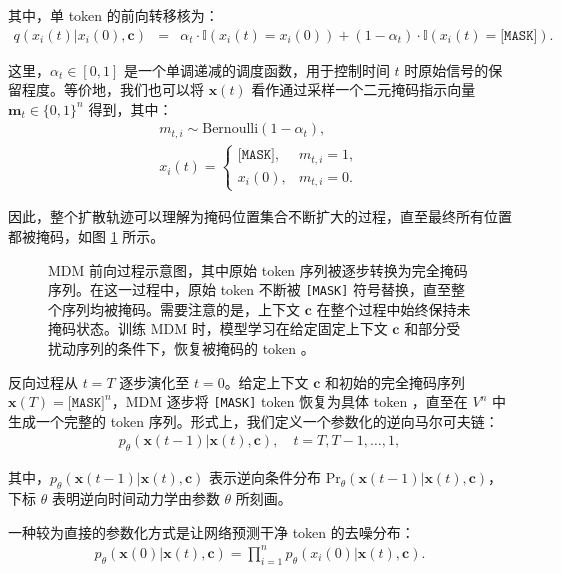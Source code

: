 \documentclass[UTF8,a4paper,zihao=-4,oneside,openany]{ctexbook}
\makeatletter
\newcommand{\AMLFigure}[2][0.96\linewidth]{%
  \begingroup
  \let\AtBeginDocument\@gobble
  \endgroup
}
\makeatother
\begin{document}
\noindent 其中，单 token 的前向转移核为：
\begin{eqnarray}
q(x_i(t) | x_i(0), \mathbf{c}) & = &\alpha_t \cdot \mathbb{I}(x_i(t)=x_i(0)) + (1-\alpha_t)\cdot \mathbb{I}(x_i(t)=\texttt{[MASK]}). \label{eq:mdm-forward-absorbing}
\end{eqnarray}

\noindent 这里，$\alpha_t \in [0,1]$ 是一个单调递减的调度函数，用于控制时间 $t$ 时原始信号的保留程度。等价地，我们也可以将 $\mathbf{x}(t)$ 看作通过采样一个二元掩码指示向量 $\mathbf{m}_t\in\{0,1\}^n$ 得到，其中：
\begin{eqnarray}
m_{t,i} \sim \mathrm{Bernoulli}(1-\alpha_t), \\
x_i(t) = \begin{cases}
\texttt{[MASK]}, & m_{t,i}=1, \\
x_i(0), & m_{t,i}=0.
\end{cases}
\label{eq:mdm-forward-maskvar}
\end{eqnarray}

\noindent 因此，整个扩散轨迹可以理解为掩码位置集合不断扩大的过程，直至最终所有位置都被掩码，如图 \ref{fig:mdm-diffusion-process} 所示。

\begin{figure}[!t]
\centering
\AMLFigure{figure-mdm-diffusion-process}
\caption{MDM 前向过程示意图，其中原始 token 序列被逐步转换为完全掩码序列。在这一过程中，原始 token 不断被 \texttt{[MASK]} 符号替换，直至整个序列均被掩码。需要注意的是，上下文 $\mathbf{c}$ 在整个过程中始终保持未掩码状态。训练 MDM 时，模型学习在给定固定上下文 $\mathbf{c}$ 和部分受扰动序列的条件下，恢复被掩码的 token 。}
\label{fig:mdm-diffusion-process}
\end{figure}

反向过程从 $t=T$ 逐步演化至 $t=0$。给定上下文 $\mathbf{c}$ 和初始的完全掩码序列 $\mathbf{x}(T)=\texttt{[MASK]}^n$，MDM 逐步将 \texttt{[MASK]}  token 恢复为具体 token ，直至在 $V^n$ 中生成一个完整的 token 序列。形式上，我们定义一个参数化的逆向马尔可夫链：
\begin{eqnarray}
p_\theta(\mathbf{x}(t-1)| \mathbf{x}(t), \mathbf{c}), \quad t=T,T-1,\dots,1,
\label{eq:mdm-reverse-kernel}
\end{eqnarray}

\noindent 其中，$p_\theta(\mathbf{x}(t-1)| \mathbf{x}(t),\mathbf{c})$ 表示逆向条件分布 $\mathrm{Pr}_\theta(\mathbf{x}(t-1)| \mathbf{x}(t),\mathbf{c})$，下标 $\theta$ 表明逆向时间动力学由参数 $\theta$ 所刻画。

一种较为直接的参数化方式是让网络预测干净 token 的去噪分布：
\begin{eqnarray}
p_\theta(\mathbf{x}(0)| \mathbf{x}(t), \mathbf{c}) = \prod_{i=1}^{n} p_\theta(x_i(0)| \mathbf{x}(t), \mathbf{c}).
\label{eq:mdm-denoise-factorize}
\end{eqnarray}
\end{document}
